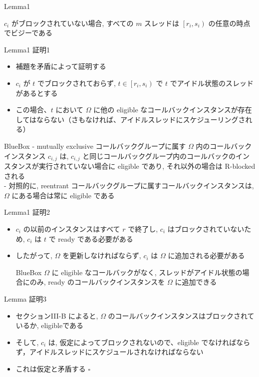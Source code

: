 \begin{frame}{Lemma1}
    \begin{lemma}[]
        $c_{i}$ がブロックされていない場合, すべての $m$ スレッドは $\left[r_{i}, s_{i}\right)$ の任意の時点でビジーである
    \end{lemma}
\end{frame}





\begin{frame}{Lemma1 証明1}
    \begin{itemize}
        \item 補題を矛盾によって証明する
        \item $c_{i}$ が $t$ でブロックされておらず, $t \in\left[r_{i}, s_{i}\right)$ で $t$ でアイドル状態のスレッドがあるとする
        \item この場合、$t$ において $\Omega$ に他の eligible なコールバックインスタンスが存在してはならない（さもなければ、アイドルスレッドにスケジューリングされる）
    \end{itemize}

        \vspace{3mm}
    \begin{beamercolorbox}[wd=\textwidth, sep=0pt, rounded=true]{BlueBox}
            - mutually exclusive コールバックグループに属す $\Omega$ 内のコールバックインスタンス $c_{i, j}$ は, $c_{i, j}$ と同じコールバックグループ内のコールバックのインスタンスが実行されていない場合に eligible であり, それ以外の場合は R-blocked される \\
            - 対照的に, reentrant コールバックグループに属すコールバックインスタンスは, $\Omega$ にある場合は常に eligible である
    \end{beamercolorbox}
\end{frame}

\begin{frame}{Lemma1 証明2}
\begin{itemize}
    \item $c_{i}$ の以前のインスタンスはすべて $r$ で終了し, $c_{i}$ はブロックされていないため, $c_{i}$ は $t$ で ready である必要がある
    \item したがって, $\Omega$ を更新しなければならず, $c_{i}$ は $\Omega$ に追加される必要がある

        \vspace{3mm}
    \begin{beamercolorbox}[wd=\textwidth, sep=0pt, rounded=true]{BlueBox}
        $\Omega$ に eligible なコールバックがなく, スレッドがアイドル状態の場合にのみ, ready のコールバックインスタンスを $\Omega$ に追加できる
    \end{beamercolorbox}
\end{itemize}
\end{frame}

\begin{frame}{Lemma 証明3}
\begin{itemize}
    \item セクションIII-B によると, $\Omega$ のコールバックインスタンスはブロックされているか, eligibleである
    \item そして, $c_{i}$ は, 仮定によってブロックされないので、eligible でなければならず，アイドルスレッドにスケジュールされなければならない
    \item これは仮定と矛盾する $\square$
\end{itemize}
\end{frame}
